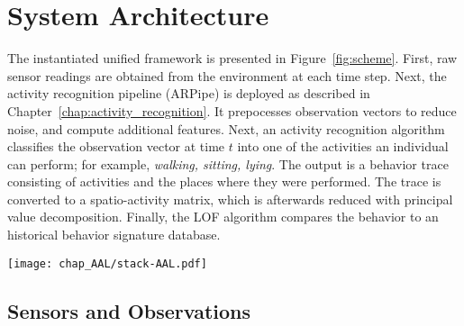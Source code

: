 



\section{System Architecture}
\label{sec:overview}
%
%
The instantiated unified framework is presented in Figure~\ref{fig:scheme}. %
First, raw sensor readings are obtained from the environment at each time step. Next, the activity recognition pipeline (ARPipe) is deployed as described in Chapter~\ref{chap:activity_recognition}. It prepocesses observation vectors to reduce noise, and compute additional features.  Next, an activity recognition algorithm classifies the observation vector at time $t$ into one of the activities an individual can perform; for example, \emph{walking, sitting, lying}. The output is a behavior trace consisting of activities and the places where they were performed. The trace is converted to a spatio-activity matrix, which is afterwards reduced with principal value decomposition. Finally, the LOF algorithm compares the behavior to an historical behavior signature database.

\begin{figure*}[!ht]
\centering
\texttt{[image: chap\_AAL/stack-AAL.pdf]}
\caption{Flowchart of the instantiated unified framework for analyzing daily-living dynamics.}
\label{fig:scheme}
\end{figure*}

\subsection{Sensors and Observations}
\label{sec:overview:data}

